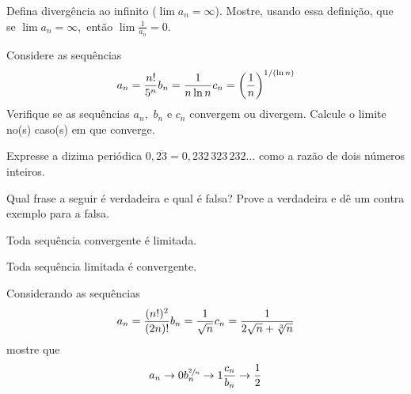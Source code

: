 \begin{exercises*}
\begin{exercise}
    Defina divergência ao infinito (\(\lim a_n=\infty\)).
    Mostre, usando essa definição, que se $\lim a_n=\infty,$ então
    \(\lim \frac{1}{a_n}=0\).
\end{exercise}

\begin{exercise}
    Considere as sequências
    \[
        a_n = \frac{n!}{5^n}    \hfill
        b_n = \frac{1}{n\ln n}  \hfill
        c_n = \left(\frac{1}{n}\right)^{1/(\ln n)} \hfill
    \]
    Verifique se as sequências $a_n,$ $b_n$ e $c_n$ convergem ou divergem.
    Calcule o limite no(s) caso(s) em que converge.
\end{exercise}

\begin{exercise}
  Expresse a dizima periódica $0,\overline{23}=0,232\,323\,232\dots$
  como a razão de dois números inteiros.
\end{exercise}

\begin{exercise}
  Qual frase a seguir é verdadeira e qual é falsa?
  Prove a verdadeira e dê um contra exemplo para a falsa.
  \begin{alphalist}
    \item Toda sequência convergente é limitada.
    \item Toda sequência limitada é convergente.
  \end{alphalist}
\end{exercise}

\begin{exercise}
Considerando as sequências
\[
  a_n = \frac{(n!)^2}{(2n)!}            \hfill
  b_n = \frac{1}{\sqrt{n}}              \hfill
  c_n = \frac{1}{2\sqrt{n}+\sqrt[3]{n}} \hfill
\]
mostre que
\[
  a_n\rightarrow 0                        \hfill
  b_n^{\sfrac{2}{n}}\rightarrow 1         \hfill
  \frac{c_n}{b_n}\rightarrow \frac{1}{2}  \hfill
\]
\end{exercise}


\end{exercises*}

